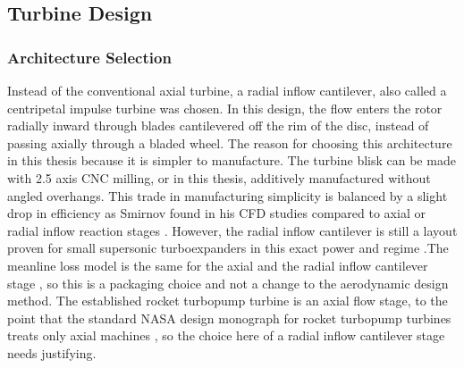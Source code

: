 

\subsection{Turbine Design}

\subsubsection{Architecture Selection} %
Instead of the conventional axial turbine, a radial inflow cantilever, also called a centripetal impulse turbine was chosen. In this design, the flow enters the rotor radially inward through blades cantilevered off the rim of the disc, instead of passing axially through a bladed wheel. The reason for choosing this architecture in this thesis because it is simpler to manufacture. The turbine blisk can be made with 2.5 axis CNC milling, or in this thesis, additively manufactured without angled overhangs. This trade in manufacturing simplicity is balanced by a slight drop in efficiency as Smirnov \cite{smirnovComparisonFourTypes2021} found in his CFD studies compared to axial or radial inflow reaction stages \cite{donnellyDesignExperimentalVerification}. However, the radial inflow cantilever is still a layout proven for small supersonic turboexpanders in this exact power and regime \cite{weissCustomizedORCMicro2020}.The meanline loss model is the same for the axial and the radial inflow cantilever stage \cite{weissCustomizedORCMicro2020}, so this is a packaging choice and not a change to the aerodynamic design method. The established rocket turbopump turbine is an axial flow stage, to the point that the standard NASA design monograph for rocket turbopump turbines treats only axial machines \cite{LiquidRocketEngine1974}, so the choice here of a radial inflow cantilever stage needs justifying. 

